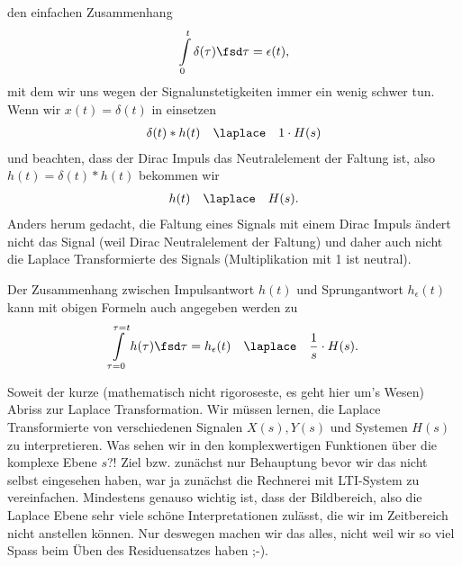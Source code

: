 den einfachen Zusammenhang
\begin{equation}
  \int\limits_{0}^{t} \delta(\tau)\fsd \tau = \epsilon(t),
\end{equation}
mit dem wir uns wegen der Signalunstetigkeiten immer ein wenig schwer tun.
%
Wenn wir $x(t)=\delta(t)$ in  einsetzen
\begin{align}
\delta(t) \ast h(t) \quad\laplace\quad 1 \cdot H(s)
\end{align}
und beachten, dass der Dirac Impuls das Neutralelement der Faltung ist,
also $h(t) = \delta(t) \ast h(t)$ bekommen wir
\begin{align}
h(t) \quad\laplace\quad H(s).
\end{align}
Anders herum gedacht, die Faltung eines Signals mit einem Dirac Impuls
ändert nicht das Signal (weil Dirac Neutralelement der Faltung) und
daher auch nicht die Laplace Transformierte des Signals (Multiplikation mit 1 ist
neutral).

Der Zusammenhang zwischen Impulsantwort $h(t)$ und Sprungantwort $h_\epsilon(t)$
kann mit obigen Formeln auch angegeben werden zu
\begin{align}
\int\limits_{\tau=0}^{\tau=t} h(\tau)\fsd \tau = h_\epsilon(t) \quad\laplace\quad \frac{1}{s} \cdot H(s).
\end{align}

Soweit der kurze (mathematisch nicht rigoroseste, es geht hier um's Wesen)
Abriss zur Laplace Transformation.
Wir müssen lernen, die Laplace Transformierte von verschiedenen
Signalen $X(s), Y(s)$ und Systemen $H(s)$ zu interpretieren. Was sehen wir in den
komplexwertigen Funktionen über die komplexe Ebene $s$?!
Ziel bzw. zunächst nur Behauptung bevor wir das nicht selbst eingesehen haben,
war ja zunächst die Rechnerei mit LTI-System zu vereinfachen.
Mindestens genauso wichtig ist, dass der Bildbereich, also die Laplace Ebene
sehr viele schöne Interpretationen zulässt, die wir im Zeitbereich nicht
anstellen können. Nur deswegen machen wir das alles, nicht weil wir so viel
Spass beim Üben des Residuensatzes haben ;-).














\newpage
